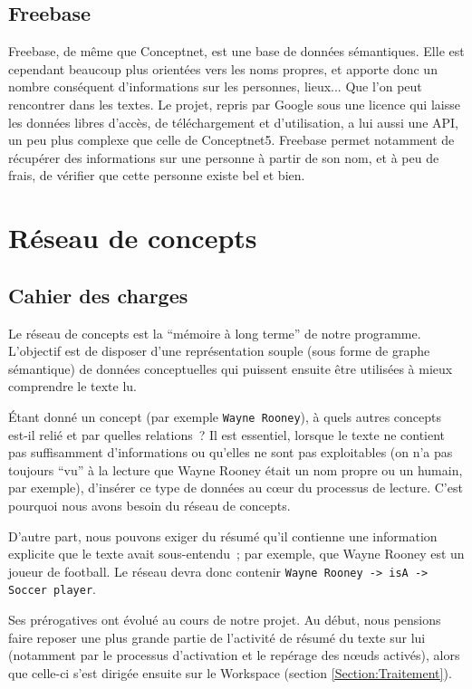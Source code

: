 \documentclass[a4paper, 12pt]{article}
\begin{document}
\subsection{Freebase}\label{Subsection:Freebase}

Freebase, de même que Conceptnet, est une base de données sémantiques. Elle est cependant beaucoup plus orientées vers les noms propres, et apporte donc un nombre conséquent d'informations sur les personnes, lieux... Que l'on peut rencontrer dans les textes. Le projet, repris par Google sous une licence qui laisse les données libres d'accès, de téléchargement et d'utilisation, a lui aussi une API, un peu plus complexe que celle de Conceptnet5. Freebase permet notamment de récupérer des informations sur une personne à partir de son nom, et à peu de frais, de vérifier que cette personne existe bel et bien.

\section{Réseau de concepts}\label{Section:RC}


\subsection{Cahier des charges}

Le réseau de concepts est la ``mémoire à long terme'' de notre programme. L'objectif est de disposer d'une représentation souple (sous forme de graphe sémantique) de données conceptuelles qui puissent ensuite être utilisées à mieux comprendre le texte lu.

Étant donné un concept (par exemple \verb|Wayne Rooney|), à quels autres concepts est-il relié et par quelles relations~? Il est essentiel, lorsque le texte ne contient pas suffisamment d'informations ou qu'elles ne sont pas exploitables (on n'a pas toujours ``vu'' à la lecture que Wayne Rooney était un nom propre ou un humain, par exemple), d'insérer ce type de données au cœur du processus de lecture. C'est pourquoi nous avons besoin du réseau de concepts.

D'autre part, nous pouvons exiger du résumé qu'il contienne une information explicite que le texte avait sous-entendu~; par exemple, que Wayne Rooney est un joueur de football. Le réseau devra donc contenir \verb|Wayne Rooney -> isA -> Soccer player|.

Ses prérogatives ont évolué au cours de notre projet. Au début, nous pensions faire reposer une plus grande partie de l'activité de résumé du texte sur lui (notamment par le processus d'activation et le repérage des nœuds activés), alors que celle-ci s'est dirigée ensuite sur le Workspace (section \ref{Section:Traitement}).
\end{document}

